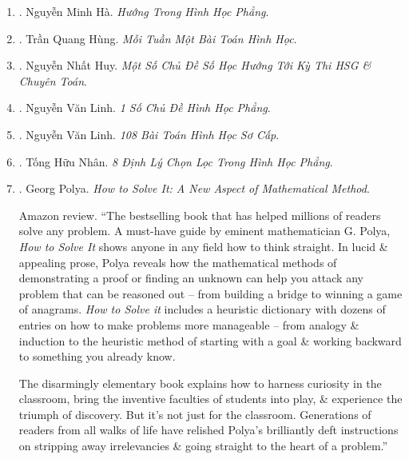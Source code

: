 \documentclass{article}
\begin{document}
\begin{enumerate}
	\item \cite{Ha_huong}. {\sc Nguyễn Minh Hà}. {\it Hướng Trong Hình Học Phẳng}.\hfill{\sf[done]}

	\item \cite{Hung_weekly_geometry}. {\sc Trần Quang Hùng}. {\it Mỗi Tuần Một Bài Toán Hình Học}.\hfill{\sf[reading]}

	\item \cite{Huy_so_hoc}. Nguyễn Nhất Huy. {\it Một Số Chủ Đề Số Học Hướng Tới Kỳ Thi HSG \& Chuyên Toán}.\hfill{\sf[reading]}

	\item \cite{Linh_topic_geometry}. Nguyễn Văn Linh. {\it 1 Số Chủ Đề Hình Học Phẳng}.\hfill{\sf[reading]}

	\item \cite{Linh_108_geometry}. Nguyễn Văn Linh. {\it 108 Bài Toán Hình Học Sơ Cấp}.\hfill{\sf[reading]}

	\item \cite{Nhan_8_geometry_theorem}. Tống Hữu Nhân. {\it 8 Định Lý Chọn Lọc Trong Hình Học Phẳng}.\hfill{\sf[reading]}

	\item \cite{Polya2014}. {\sc Georg Polya}. {\it How to Solve It: A New Aspect of Mathematical Method}. {}

	{\sf Amazon review.} ``The bestselling book that has helped millions of readers solve any problem. A must-have guide by eminent mathematician {\sc G. Polya}, {\it How to Solve It} shows anyone in any field how to think straight. In lucid \& appealing prose, {\sc Polya} reveals how the mathematical methods of demonstrating a proof or finding an unknown can help you attack any problem that can be reasoned out -- from building a bridge to winning a game of anagrams. {\it How to Solve it} includes a heuristic dictionary with dozens of entries on how to make problems more manageable -- from analogy \& induction to the heuristic method of starting with a goal \& working backward to something you already know.

	The disarmingly elementary book explains how to harness curiosity in the classroom, bring the inventive faculties of students into play, \& experience the triumph of discovery. But it's not just for the classroom. Generations of readers from all walks of life have relished {\sc Polya}'s brilliantly deft instructions on stripping away irrelevancies \& going straight to the heart of a problem.''


\end{enumerate}
\end{document}
